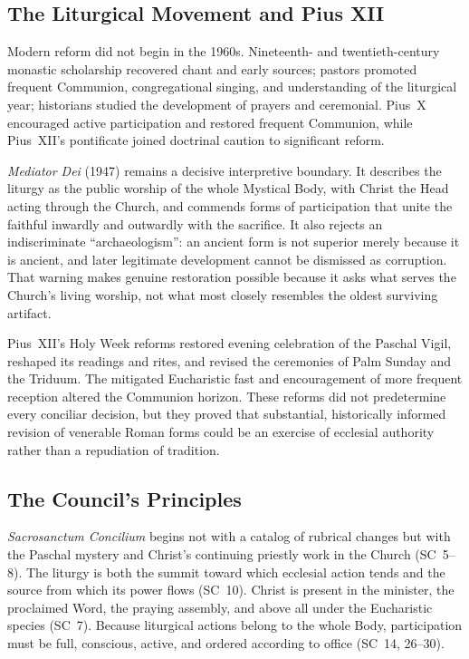 \subsection{The Liturgical Movement and Pius XII}

Modern reform did not begin in the 1960s. Nineteenth- and twentieth-century monastic scholarship recovered chant and early sources; pastors promoted frequent Communion, congregational singing, and understanding of the liturgical year; historians studied the development of prayers and ceremonial. Pius~X encouraged active participation and restored frequent Communion, while Pius~XII's pontificate joined doctrinal caution to significant reform.

\emph{Mediator Dei} (1947) remains a decisive interpretive boundary. It describes the liturgy as the public worship of the whole Mystical Body, with Christ the Head acting through the Church, and commends forms of participation that unite the faithful inwardly and outwardly with the sacrifice. It also rejects an indiscriminate ``archaeologism'': an ancient form is not superior merely because it is ancient, and later legitimate development cannot be dismissed as corruption. That warning makes genuine restoration possible because it asks what serves the Church's living worship, not what most closely resembles the oldest surviving artifact.

Pius~XII's Holy Week reforms restored evening celebration of the Paschal Vigil, reshaped its readings and rites, and revised the ceremonies of Palm Sunday and the Triduum. The mitigated Eucharistic fast and encouragement of more frequent reception altered the Communion horizon. These reforms did not predetermine every conciliar decision, but they proved that substantial, historically informed revision of venerable Roman forms could be an exercise of ecclesial authority rather than a repudiation of tradition.

\subsection{The Council's Principles}

\emph{Sacrosanctum Concilium} begins not with a catalog of rubrical changes but with the Paschal mystery and Christ's continuing priestly work in the Church (SC~5--8). The liturgy is both the summit toward which ecclesial action tends and the source from which its power flows (SC~10). Christ is present in the minister, the proclaimed Word, the praying assembly, and above all under the Eucharistic species (SC~7). Because liturgical actions belong to the whole Body, participation must be full, conscious, active, and ordered according to office (SC~14, 26--30).


